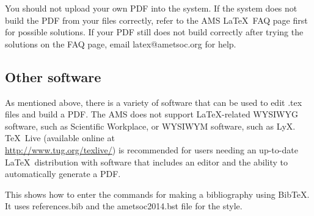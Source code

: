 \documentclass{ametsoc}
\begin{document}
You should not upload your own PDF into
the system. If the system does not build the PDF from your files correctly,
refer to the AMS \LaTeX\ FAQ page first for possible solutions. If your PDF
still does not build correctly after trying the solutions on the FAQ page, email
latex@ametsoc.org for help.

\subsection{Other software}
As mentioned above, there is a variety of software that can be used to edit
.tex files and build a PDF.  The AMS does not support \LaTeX\/-related
WYSIWYG software, such as Scientific Workplace, or WYSIWYM software, such as
LyX.  \TeX\ Live (available online at \\ \url{http://www.tug.org/texlive/}) is
recommended for users needing an up-to-date \LaTeX\ distribution with
software that includes an editor and the ability to automatically generate a
PDF.





 This shows how to enter the commands for making a bibliography using
 BibTeX. It uses references.bib and the ametsoc2014.bst file for the style.

 
 

\end{document}
